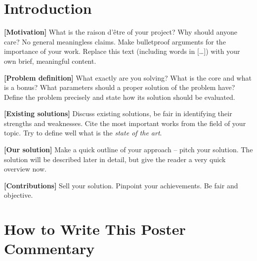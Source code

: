 \documentclass{ExcelAtFIT}
\affiliation{*%
  \href{mailto:herout@vut.cz}{herout@vut.cz},
  \textit{Faculty of Information Technology, Brno University of Technology}}
\begin{document}
\startdocument


\section{Introduction}

\textbf{[Motivation]} What is the raison d'\^{e}tre of your project? Why should anyone care? No general meaningless claims. Make bulletproof arguments for the importance of your work. Replace this text (including words in [\dots]) with your own brief, meaningful content.

\textbf{[Problem definition]} What exactly are you solving? What is the core and what is a bonus? What parameters should a proper solution of the problem have? Define the problem precisely and state how its solution should be evaluated.

\textbf{[Existing solutions]} Discuss existing solutions, be fair in identifying their strengths and weaknesses. Cite the most important works from the field of your topic. Try to define well what is the \textit{state of the art}.

\textbf{[Our solution]} Make a quick outline of your approach -- pitch your solution.  The solution will be described later in detail, but give the reader a very quick overview now.

\textbf{[Contributions]} Sell your solution. Pinpoint your achievements. Be fair and objective.


\section{How to Write This Poster Commentary}
\label{sec:Introduction}
\end{document}

